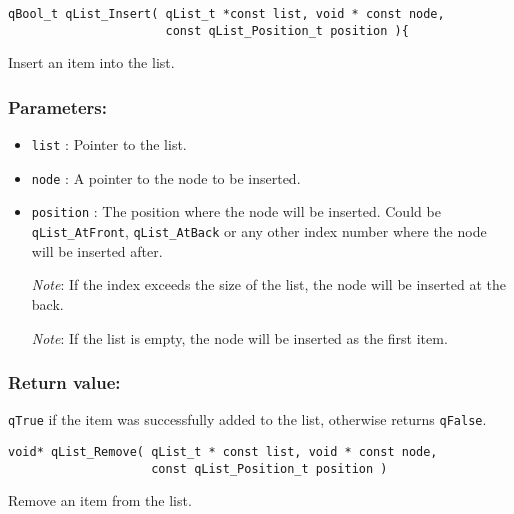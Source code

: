 \noindent\hrulefill

\begin{lstlisting}[style=CStyle]
qBool_t qList_Insert( qList_t *const list, void * const node, 
                      const qList_Position_t position ){
\end{lstlisting}

Insert an item into the list. 

\subsubsection*{Parameters:}
\begin{itemize}
    \item \lstinline{list} : Pointer to the list. 
    \item \lstinline{node} : A pointer to the node to be inserted.
    \item \lstinline{position} : The position where the node will be inserted. Could be \lstinline{qList_AtFront}, \lstinline{qList_AtBack} or any other index number where the node will be inserted after.
    
    \textit{Note}: If the index exceeds the size of the list, the node will be inserted at the back.
    
    \textit{Note}: If the list is empty, the node will be inserted as the first item.
\end{itemize}

\subsubsection*{Return value:}
\lstinline{qTrue} if the item was successfully added to the list, otherwise returns \lstinline{qFalse}. 

\noindent\hrulefill

\begin{lstlisting}[style=CStyle]
void* qList_Remove( qList_t * const list, void * const node, 
                    const qList_Position_t position )
\end{lstlisting}

Remove an item from the list. 

